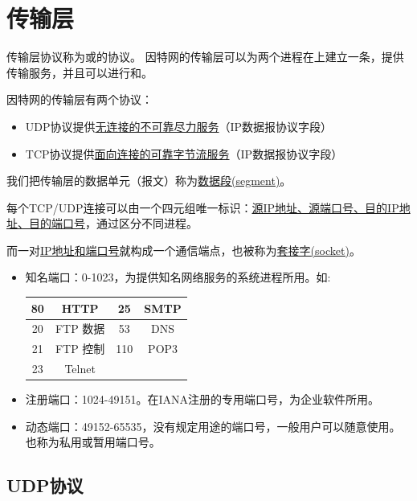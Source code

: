 
\section{传输层} %
传输层协议称为或的协议。 因特网的传输层可以为两个进程在上建立一条，提供传输服务，并且可以进行和。

因特网的传输层有两个协议：
\begin{itemize}
\item UDP协议提供\underline{无连接的不可靠尽力服务}（IP数据报协议字段）
\item TCP协议提供\underline{面向连接的可靠字节流服务}（IP数据报协议字段）
\end{itemize}

我们把传输层的数据单元（报文）称为\underline{数据段(segment)}。

每个TCP/UDP连接可以由一个四元组唯一标识：\underline{源IP地址、源端口号、目的IP地址、目的端口号}，通过区分不同进程。

而一对\underline{IP地址和端口号}就构成一个通信端点，也被称为\underline{套接字(socket)}。

\begin{itemize}
    \item 知名端口：0-1023，为提供知名网络服务的系统进程所用。如:
    \begin{center}
    \begin{tabular}{|c|c|c|c|}\hline
        80 & HTTP & 25 & SMTP\\\hline
        20 & FTP 数据 & 53 & DNS\\\hline
        21 & FTP 控制 & 110 & POP3\\\hline
        23 & Telnet & &\\\hline
    \end{tabular}
    \end{center}
    \item 注册端口：1024-49151。在IANA注册的专用端口号，为企业软件所用。
    \item 动态端口：49152-65535，没有规定用途的端口号，一般用户可以随意使用。也称为私用或暂用端口号。
\end{itemize}

\subsection{UDP协议}
